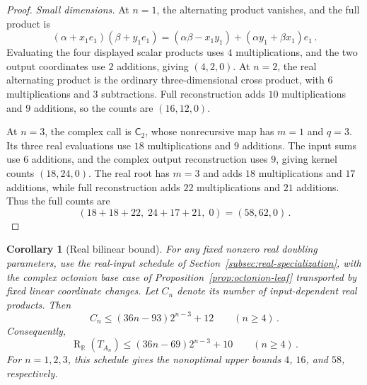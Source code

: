 \documentclass[11pt,reqno]{amsart}
\numberwithin{equation}{section}
\newtheorem{corollary}[proposition]{Corollary}
\newcommand{\R}{\mathbb R}
\newcommand{\Rk}{\operatorname{R}}
\newcommand{\AltC}{\mathsf C}
\begin{document}
\begin{proof}
\emph{Small dimensions.} At $n=1$, the alternating product vanishes,
and the full product is
\[
(\alpha+x_1e_1)(\beta+y_1e_1)
=(\alpha\beta-x_1y_1)+(\alpha y_1+\beta x_1)e_1\,.
\]
Evaluating the four displayed scalar products uses $4$ multiplications,
and the two output coordinates use $2$ additions, giving $(4,2,0)$.
At $n=2$, the real alternating product is the ordinary three-dimensional
cross product, with $6$ multiplications and $3$ subtractions. Full
reconstruction adds $10$ multiplications and $9$ additions, so the
counts are $(16,12,0)$.

At $n=3$, the complex call is $\AltC_2$, whose nonrecursive map has $m=1$ and
$q=3$. Its three real evaluations use $18$ multiplications and $9$
additions. The input sums use $6$ additions, and the complex output
reconstruction uses $9$, giving kernel counts $(18,24,0)$. The real
root has $m=3$ and adds $18$ multiplications and $17$ additions, while
full reconstruction adds $22$ multiplications and $21$ additions. Thus
the full counts are
\[
(18+18+22,\;24+17+21,\;0)=(58,62,0)\,.
\]
\end{proof}

\begin{corollary}[Real bilinear bound]\label{cor:real-rank}
For any fixed nonzero real doubling parameters, use the real-input
schedule of Section~\ref{subsec:real-specialization}, with the complex
octonion base case of Proposition~\ref{prop:octonion-leaf} transported by
fixed linear coordinate changes. Let $C_n$ denote its number of
input-dependent real products. Then
\begin{equation}\label{eq:Cn}
C_n\le(36n-93)2^{n-3}+12\qquad(n\ge4)\,.
\end{equation}
Consequently,
\begin{equation}\label{eq:rank-bound}
\Rk_{\R}(T_{A_n})\le(36n-69)2^{n-3}+10\qquad(n\ge4)\,.
\end{equation}
For $n=1,2,3$, this schedule gives the nonoptimal upper bounds $4$,
$16$, and $58$, respectively.
\end{corollary}
\end{document}
